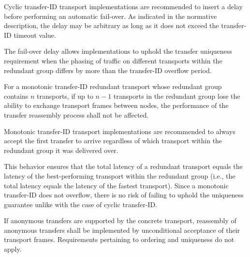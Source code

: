 \begin{remark}
    Cyclic transfer-ID transport implementations are recommended to insert a delay before performing
    an automatic fail-over.
    As indicated in the normative description, the delay may be arbitrary as long as it does not exceed the
    transfer-ID timeout value.

    The fail-over delay allows implementations to uphold the transfer uniqueness requirement when the phasing of
    traffic on different transports within the redundant group differs by more than the transfer-ID overflow period.
\end{remark}

For a monotonic transfer-ID redundant transport whose redundant group contains $n$ transports,
if up to $n-1$ transports in the redundant group lose the ability to exchange transport frames between nodes,
the performance of the transfer reassembly process shall not be affected.

\begin{remark}
    Monotonic transfer-ID transport implementations are recommended to always accept the first transfer
    to arrive regardless of which transport within the redundant group it was delivered over.

    This behavior ensures that the total latency of a redundant transport equals the latency of the best-performing
    transport within the redundant group (i.e., the total latency equals the latency of the fastest transport).
    Since a monotonic transfer-ID does not overflow, there is no risk of failing to uphold the uniqueness guarantee
    unlike with the case of cyclic transfer-ID.
\end{remark}

If anonymous transfers are supported by the concrete transport,
reassembly of anonymous transfers shall be implemented by unconditional acceptance of their transport frames.
Requirements pertaining to ordering and uniqueness do not apply.

